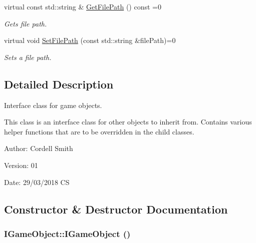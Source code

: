 \begin{CompactItemize}
virtual const std::string \& \hyperlink{class_i_game_object_bd2bd922cf7546ae9dccb259dae58c99}{GetFilePath} () const =0
\begin{CompactList}\small\item\em Gets file path. \item\end{CompactList}\item 
virtual void \hyperlink{class_i_game_object_4ff2c43df492113b7b51ce68d965defa}{SetFilePath} (const std::string \&filePath)=0
\begin{CompactList}\small\item\em Sets a file path. \item\end{CompactList}\end{CompactItemize}


\subsection{Detailed Description}
Interface class for game objects. 

This class is an interface class for other objects to inherit from. Contains various helper functions that are to be overridden in the child classes.

\begin{Desc}
\item[Author:]Cordell Smith \end{Desc}
\begin{Desc}
\item[Version:]01 \end{Desc}
\begin{Desc}
\item[Date:]29/03/2018 CS \end{Desc}


\subsection{Constructor \& Destructor Documentation}
\hypertarget{class_i_game_object_20daa5a14a79200a4b995ef763e4bbb5}{
\subsubsection[IGameObject]{\setlength{\rightskip}{0pt plus 5cm}IGameObject::IGameObject ()}}
\label{class_i_game_object_20daa5a14a79200a4b995ef763e4bbb5}


